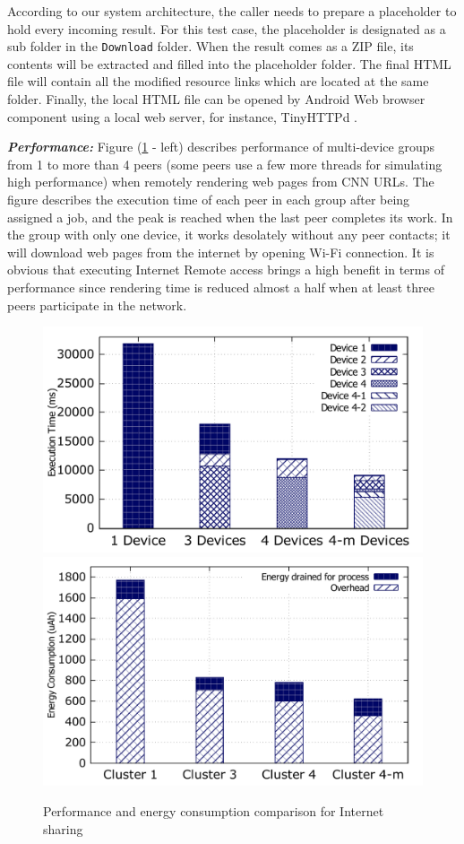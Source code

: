 \documentclass{sig-alternate}[10pt]
\begin{document}
According to our system architecture, the caller needs to prepare a placeholder to hold every incoming result. For this test case, the placeholder is designated as a sub folder in the \texttt{Download} folder. When the result comes as a ZIP file, its contents will be extracted and filled into the placeholder folder. The final HTML file will contain all the modified resource links which are located at the same folder. Finally, the local HTML file can be opened by Android Web browser component using a local web server, for instance, TinyHTTPd \cite{tinyhttpd}.

\textbf{\emph{Performance:}}
Figure (\ref{fig:net_clusters_perf} - left) describes performance of multi-device groups from 1 to more than 4 peers (some peers use a few more threads for simulating high performance) when remotely rendering web pages from CNN URLs. The figure describes the execution time of each peer in each group after being assigned a job, and the peak is reached when the last peer completes its work. In the group with only one device, it works desolately without any peer contacts; it will download web pages from the internet by opening Wi-Fi connection. It is obvious that executing Internet Remote access brings a high benefit in terms of performance since rendering time is reduced almost a half when at least three peers participate in the network. 


\begin{figure}
	\centering
		\includegraphics[width=.45\textwidth]{data/net_perf_01.pdf}
		\includegraphics[width=.45\textwidth]{data/net_energy.pdf}
	\caption{Performance and energy consumption comparison for Internet sharing}
	\label{fig:net_clusters_perf}
\end{figure}
\end{document}
